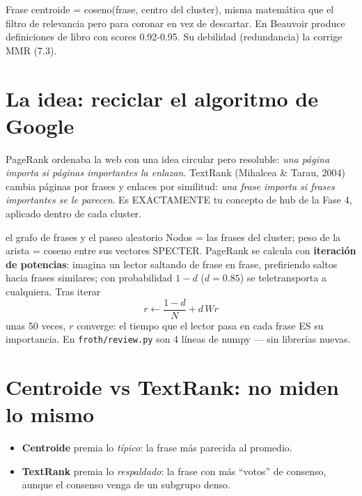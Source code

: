 \documentclass[11pt,a4paper]{article}
\begin{document}
\begin{resumen}
Frase centroide = coseno(frase, centro del cluster), misma matemática que el filtro de
relevancia pero para coronar en vez de descartar. En Beauvoir produce definiciones de
libro con scores 0.92-0.95. Su debilidad (redundancia) la corrige MMR (7.3).
\end{resumen}
\clearpage
{}
{}

\section{La idea: reciclar el algoritmo de Google}

PageRank ordenaba la web con una idea circular pero resoluble: \emph{una página importa
si páginas importantes la enlazan}. TextRank (Mihalcea \& Tarau, 2004) cambia páginas por
frases y enlaces por similitud: \emph{una frase importa si frases importantes se le
parecen}. Es EXACTAMENTE tu concepto de hub de la Fase 4, aplicado dentro de cada cluster.

\begin{concepto}{el grafo de frases y el paseo aleatorio}
Nodos = las frases del cluster; peso de la arista = coseno entre sus vectores SPECTER.
PageRank se calcula con \textbf{iteración de potencias}: imagina un lector saltando de
frase en frase, prefiriendo saltos hacia frases similares; con probabilidad $1-d$
($d=0.85$) se teletransporta a cualquiera. Tras iterar
\[
r \leftarrow \frac{1-d}{N} + d \, W r
\]
unas 50 veces, $r$ converge: el tiempo que el lector pasa en cada frase ES su importancia.
En \texttt{froth/review.py} son 4 líneas de numpy --- sin librerías nuevas.
\end{concepto}

\section{Centroide vs TextRank: no miden lo mismo}

\begin{itemize}
  \item \textbf{Centroide} premia lo \emph{típico}: la frase más parecida al promedio.
  \item \textbf{TextRank} premia lo \emph{respaldado}: la frase con más ``votos'' de
        consenso, aunque el consenso venga de un subgrupo denso.
\end{itemize}
\end{document}
